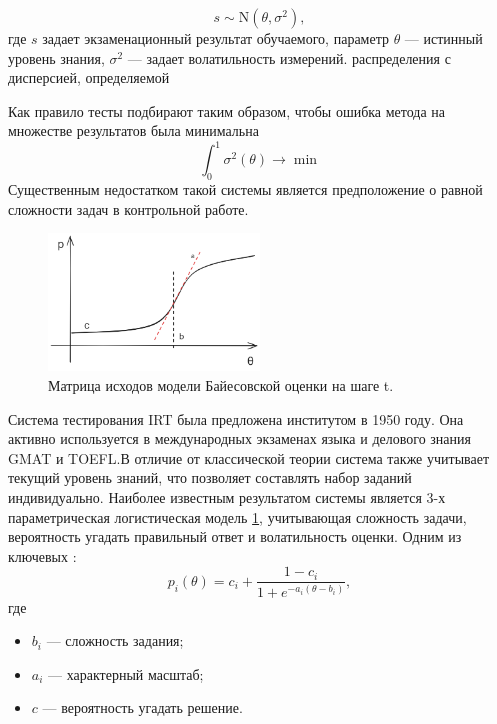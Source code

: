 \begin{equation}
    s \sim \mathrm{N}(\theta,\sigma^2), 
\end{equation}
где $s$ задает экзаменационный результат обучаемого, параметр $\theta$ --- истинный уровень знания, 
$\sigma^2$ --- задает волатильность измерений. распределения с дисперсией, определяемой 

Как правило тесты подбирают таким образом, чтобы ошибка метода на множестве результатов была минимальна
$$
    \int_0^1 \sigma^2(\theta) \rightarrow \min
$$
Существенным недостатком такой системы является предположение о равной сложности задач в контрольной работе.

\begin{figure}[h]
    \centering
    \includegraphics[width=0.5\textwidth]{assets/pedagogic/social/irt.excalidraw.png}
    \caption{Матрица исходов модели Байесовской оценки на шаге t.}
    \label{irt_function}
\end{figure}

Система тестирования IRT была предложена институтом в 1950 году. Она активно используется в международных экзаменах языка
и делового знания GMAT и TOEFL.В отличие от классической теории система также учитывает текущий уровень знаний, что позволяет составлять набор заданий индивидуально.
Наиболее известным результатом системы является 3-х параметрическая логистическая модель \ref{irt_function}, учитывающая сложность задачи, вероятность угадать правильный ответ и волатильность оценки.
Одним из ключевых \cite{lord1956measurement}:
\begin{equation}
    p_i(\theta) = c_i + \frac{1-c_i}{1+e^{-a_i(\theta-b_i)}},
\end{equation}
где \begin{itemize}
    \item $b_i$ --- сложность задания;
    \item $a_i$ --- характерный масштаб;
    \item $c$ --- вероятность угадать решение.
\end{itemize}

